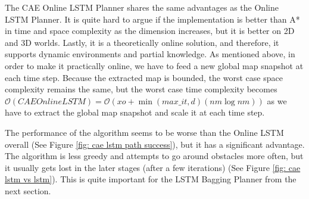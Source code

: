 The CAE Online LSTM Planner shares the same advantages as the Online LSTM Planner. It is quite hard to argue if the implementation is better than A* in time and space complexity as the dimension increases, but it is better on 2D and 3D worlds. Lastly, it is a theoretically online solution, and therefore, it supports dynamic environments and partial knowledge. As mentioned above, in order to make it practically online, we have to feed a new global map snapshot at each time step. Because the extracted map is bounded, the worst case space complexity remains the same, but the worst case time complexity becomes $\mathcal{O}(CAEOnlineLSTM) = \mathcal{O}(xo + \min(max\_it, d)(nm \log nm))$ as we have to extract the global map snapshot and scale it at each time step.

The performance of the algorithm seems to be worse than the Online LSTM overall (See Figure \ref{fig: cae lstm path success}), but it has a significant advantage. The algorithm is less greedy and attempts to go around obstacles more often, but it usually gets lost in the later stages (after a few iterations) (See Figure \ref{fig: cae lstm vs lstm}). This is quite important for the LSTM Bagging Planner from the next section.


